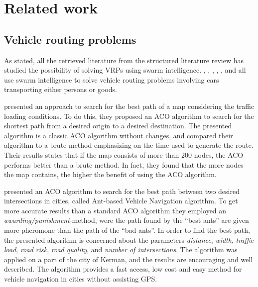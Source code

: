 \section{Related work}
\label{sec:relatedWork}



\subsection{Vehicle routing problems}
\label{subsec:relatedWorkVRP}

As stated, all the retrieved literature from the structured literature review has studied the possibility of solving VRPs using swarm intelligence. \citet{hsiao04}, \citet{salehi-nezhad07}, \citet{tripathi09}, \citet{dias14}, \citet{salehinejad10}, and \citet{sedighpour14} all use swarm intelligence to solve vehicle routing problems involving cars transporting either persons or goods.

\citet{hsiao04} presented an approach to search for the best path of a map considering the traffic loading conditions. To do this, they proposed an ACO algorithm to search for the shortest path from a desired origin to a desired destination. The presented algorithm is a classic ACO algorithm without changes, and compared their algorithm to a brute method emphasizing on the time used to generate the route. Their results states that if the map consists of more than 200 nodes, the ACO performs better than a brute method. In fact, they found that the more nodes the map contains, the higher the benefit of using the ACO algorithm. 

\citet{salehi-nezhad07} presented an ACO algorithm to search for the best path between two desired intersections in cities, called Ant-based Vehicle Navigation algorithm. To get more accurate results than a standard ACO algorithm they employed an \textit{awarding/punishment}-method, were the path found by the ``best ants'' are given more pheromone than the path of the ``bad ants''. In order to find the best path, the presented algorithm is concerned about the parameters \textit{distance}, \textit{width}, \textit{traffic load}, \textit{road risk}, \textit{road quality}, and \textit{number of intersections}. The algorithm was applied on a part of the city of Kerman, and the results are encouraging and well described. The algorithm provides a fast access, low cost and easy method for vehicle navigation in cities without assisting GPS.


